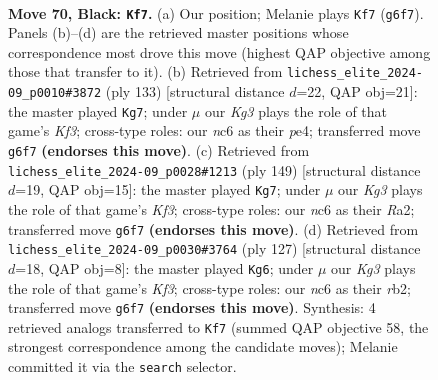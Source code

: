 \documentclass[11pt]{article}
\begin{document}
\clearpage

\begin{figure}[p]\centering
\begin{subfigure}{0.46\textwidth}\centering
\resizebox{\linewidth}{!}{%
\newchessgame
\chessboard[
  setfen={8/6p1/2N2pk1/7p/3P3P/6PK/3r4/1R6 b - - 34 70},
  showmover=false,
  pgfstyle=straightmove, color=movearrow, markmove={g6-f7}
]}
\caption{}
\end{subfigure}\hfill
\begin{subfigure}{0.46\textwidth}\centering
\resizebox{\linewidth}{!}{%
\newchessgame
\chessboard[
  setfen={8/5p2/5kp1/R6p/4P2P/5PK1/6P1/7r b - - 20 67},
  showmover=false,
  pgfstyle=straightmove, color=movearrow, markmove={f6-g7}
]}
\caption{}
\end{subfigure}
\\[4pt]
\begin{subfigure}{0.46\textwidth}\centering
\resizebox{\linewidth}{!}{%
\newchessgame
\chessboard[
  setfen={8/5p2/5kp1/2R4p/5P1P/6PK/r7/8 b - - 26 75},
  showmover=false,
  pgfstyle=straightmove, color=movearrow, markmove={f6-g7}
]}
\caption{}
\end{subfigure}\hfill
\begin{subfigure}{0.46\textwidth}\centering
\resizebox{\linewidth}{!}{%
\newchessgame
\chessboard[
  setfen={8/6p1/4pk2/6p1/r5P1/6KP/1R3P2/8 b - - 10 64},
  showmover=false,
  pgfstyle=straightmove, color=movearrow, markmove={f6-g6}
]}
\caption{}
\end{subfigure}
\caption{\textbf{Move 70, Black: \texttt{Kf7}.} (a) Our position; Melanie plays \texttt{Kf7} (\texttt{g6f7}). Panels (b)--(d) are the retrieved master positions whose correspondence most drove this move (highest QAP objective among those that transfer to it). (b) Retrieved from \texttt{lichess\_elite\_2024-09\_p0010\#3872} (ply 133) [structural distance $d$=22, QAP obj=21]: the master played \texttt{Kg7}; under $\mu$ our \emph{Kg3} plays the role of that game's \emph{Kf3}; cross-type roles: our \emph{n}c6 as their \emph{p}e4; transferred move \texttt{g6f7} \textbf{(endorses this move)}. (c) Retrieved from \texttt{lichess\_elite\_2024-09\_p0028\#1213} (ply 149) [structural distance $d$=19, QAP obj=15]: the master played \texttt{Kg7}; under $\mu$ our \emph{Kg3} plays the role of that game's \emph{Kf3}; cross-type roles: our \emph{n}c6 as their \emph{R}a2; transferred move \texttt{g6f7} \textbf{(endorses this move)}. (d) Retrieved from \texttt{lichess\_elite\_2024-09\_p0030\#3764} (ply 127) [structural distance $d$=18, QAP obj=8]: the master played \texttt{Kg6}; under $\mu$ our \emph{Kg3} plays the role of that game's \emph{Kf3}; cross-type roles: our \emph{n}c6 as their \emph{r}b2; transferred move \texttt{g6f7} \textbf{(endorses this move)}. Synthesis: 4 retrieved analogs transferred to \texttt{Kf7} (summed QAP objective 58, the strongest correspondence among the candidate moves); Melanie committed it via the \texttt{search} selector.}
\label{fig:thought-m139}
\end{figure}
\end{document}
